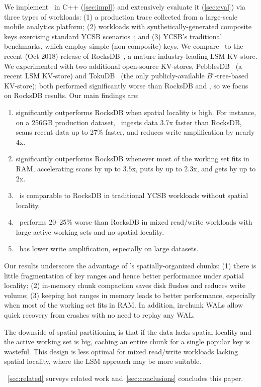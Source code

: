 We implement \sys\ in  C++ (\cref{sec:impl}) and extensively evaluate it (\cref{sec:eval})
via three types of workloads: (1) a production trace collected from a large-scale mobile analytics platform; 
(2)  workloads with synthetically-generated composite keys exercising  standard YCSB scenarios~\cite{YCSB};
and (3)  YCSB's traditional benchmarks, which employ simple (non-composite) keys.  
We compare \sys\ to the recent (Oct 2018) release of RocksDB~\cite{RocksDB}, a mature industry-leading LSM KV-store. 
We  experimented with two additional open-source KV-stores, PebblesDB~\cite{PebblesDB} (a recent LSM KV-store) and  
TokuDB~\cite{TokuDB} (the only publicly-available $B^{\epsilon}$-tree-based 
KV-store); both performed significantly worse than  RocksDB and \sys, so we focus on RocksDB results. 
Our main findings are: 
\begin{enumerate} 
\item \sys\/ significantly outperforms RocksDB when spatial  locality is high.  
For instance, on a 256GB production dataset, \sys\ ingests data 3.7x faster than RocksDB,  scans recent  data up to 27\% faster, 
and reduces write amplification by nearly 4x. 
\item \sys\/ significantly outperforms RocksDB whenever most of the working set fits in RAM, 
accelerating scans by up to $3.5$x, puts by up to $2.3$x, and gets by up to $2$x. 
\item \sys\ is comparable to RocksDB in traditional YCSB workloads without spatial locality. 
\item \sys\ performs 20--25\% worse  than RocksDB  in mixed read/write workloads with large active working sets and no spatial locality. 
\item \sys\ has lower write amplification, especially on large datasets.  
\end{enumerate}

Our results underscore the advantage of \sys's spatially-organized chunks:
(1) there is little fragmentation of key ranges and hence better  performance under spatial locality; 
(2) in-memory chunk compaction saves disk flushes and reduces write volume;  
(3) keeping hot ranges in memory leads to better performance, especially when most of the working set fits in RAM.
In addition, in-chunk WALs  allow quick recovery from crashes with no need to replay any WAL.

The downside of spatial partitioning is that if the data lacks spatial locality and the active working set is big, 
caching an entire chunk for a single popular key is wasteful.  This design is less optimal for mixed read/write workloads lacking spatial locality, where the LSM approach may be more suitable.  

~\cref{sec:related}  surveys related work and~\cref{sec:conclusions} concludes this paper. 
